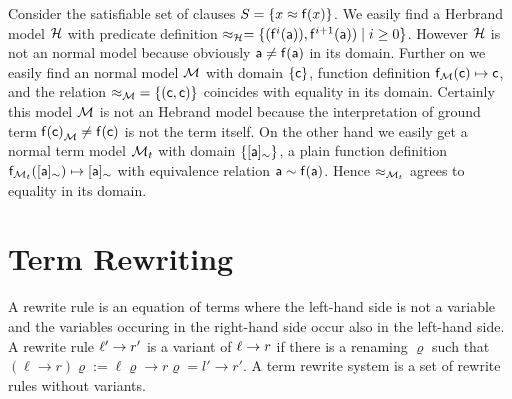 \begin{example}
	Consider the satisfiable set of clauses $S = \{ x \approx {\mathsf f}(x) \}$. 
%	
	We easily find a Herbrand model ${\mathcal H}$ with
	predicate definition $\approx_{\mathcal H} = \{ ({\mathsf f}^{i}({\mathsf a})), {\mathsf f}^{i+1}({\mathsf a})) \mid i\geq 0  \} $. 
	However ${\mathcal H}$ is not an normal model because obviously ${\mathsf a}\neq{\mathsf f}({\mathsf a})$ in its domain.
%	
	Further on we easily find an normal model ${\mathcal M}$ 
	with domain $\{ {\mathsf c} \}$, function definition ${\mathsf f}_{\mathcal M}({\mathsf c}) \mapsto {\mathsf c}$, 
	and the relation ${\approx_{\mathcal M}} = \{ ({\mathsf c},{\mathsf c})\}$ coincides with equality in its domain.
	Certainly this model ${\mathcal M}$ is not an Hebrand model 
	because the interpretation of ground term ${{\mathsf f}({\mathsf c})}_{\mathcal M} \neq {\mathsf f}({\mathsf c})$ is not the term itself.
%	
	On the other hand we easily get a normal term model ${\mathcal M}_t$ with domain $\{ [{\mathsf a}]_\sim\}$, 
	a plain function definition
	${\mathsf f}_{{\mathcal M}_t}([{\mathsf a}]_\sim) \mapsto [{\mathsf a}]_\sim$ 
	with equivalence relation
	${\mathsf a} \sim {\mathsf f}({\mathsf a})$.
	Hence $\approx_{{\mathcal M}_t}$ agrees to equality in its domain.	
\end{example}


\section{Term Rewriting}\label{sec:termrewriting}


\begin{definition}\label{def:rewriterule}
	A {\myem rewrite rule} is an equation of terms where the left-hand side is not a variable
	and the variables occuring in the right-hand side occur also in the left-hand side.
	A rewrite rule $\ell'\rightarrow r'$ is a {\myem variant} of $\ell\rightarrow r$ if there is a renaming $\varrho$
	such that 
	$(\ell\rightarrow r)\varrho := \ell\varrho\rightarrow r\varrho = l'\rightarrow r'$.
	A {\myem term rewrite system} is a set of rewrite rules without variants.
\end{definition}

